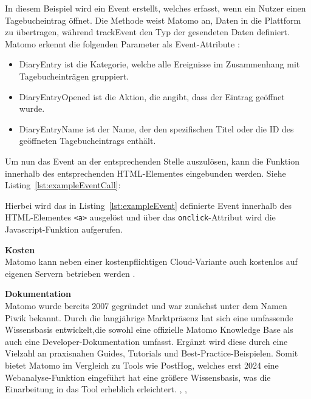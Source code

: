 In diesem Beispiel wird ein Event erstellt, welches erfasst, wenn ein Nutzer einen Tagebucheintrag öffnet. Die Methode \texttt{} weist Matomo an, Daten in die Plattform zu übertragen, während \glqq trackEvent\grqq{} den Typ der gesendeten Daten definiert. Matomo erkennt die folgenden Parameter als Event-Attribute \parencite{MatomoEvent}:

\begin{itemize}
    \item  \glqq DiaryEntry\grqq{} ist die Kategorie, welche alle Ereignisse im Zusammenhang mit Tagebucheinträgen gruppiert.
    \item \glqq DiaryEntryOpened\grqq{} ist die Aktion, die angibt, dass der Eintrag geöffnet wurde.
    \item \glqq DiaryEntryName\grqq{} ist der Name, der den spezifischen Titel oder die ID des geöffneten Tagebucheintrags enthält.
\end{itemize}

Um nun das Event an der entsprechenden Stelle auszulösen, kann die Funktion innerhalb des entsprechenden HTML-Elementes eingebunden werden. Siehe Listing~\ref{lst:exampleEventCall}: 

\begin{figure}[H]
    \centering
    \begin{minipage}{\textwidth}
        
    \end{minipage}
\end{figure}

Hierbei wird das in Listing~\ref{lst:exampleEvent} definierte Event innerhalb des HTML-Elementes \texttt{<a>} ausgelöst und über das \texttt{onclick}-Attribut wird die Javascript-Funktion aufgerufen.

\textbf{Kosten} \\
Matomo kann neben einer kostenpflichtigen Cloud-Variante auch kostenlos auf eigenen Servern betrieben werden \parencite{MatomoFree}. 

\textbf{Dokumentation} \\
Matomo wurde bereits 2007 gegründet und war zunächst unter dem Namen Piwik bekannt. Durch die langjährige Marktpräsenz hat sich eine umfassende Wissensbasis entwickelt,die sowohl eine offizielle Matomo Knowledge Base als auch eine Developer-Dokumentation umfasst. Ergänzt wird diese durch eine Vielzahl an praxisnahen Guides, Tutorials und Best-Practice-Beispielen. Somit bietet Matomo im Vergleich zu Tools wie PostHog, welches erst 2024 eine Webanalyse-Funktion eingeführt hat eine größere Wissensbasis, was die Einarbeitung in das Tool erheblich erleichtert. \parencite{MatomoKnowledgeBase}, \parencite{Förster2024}, \parencite{MatomoDevelop}

